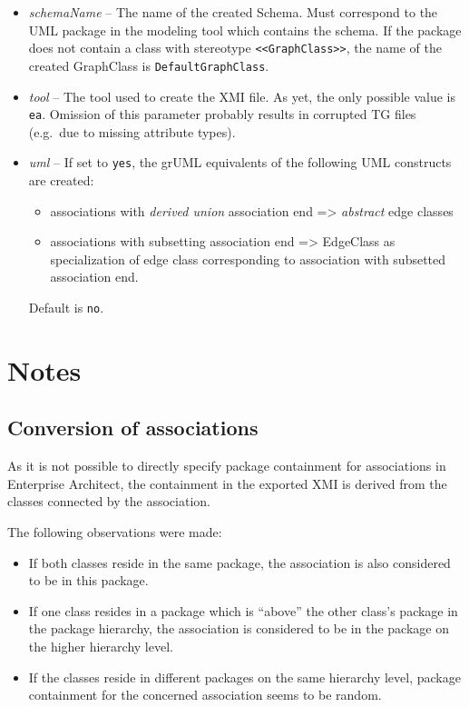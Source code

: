 \documentclass[a4paper]{article}
\begin{document}
\begin{itemize}
		\item \emph{schemaName} -- The name of the created Schema. Must correspond to the UML package in the modeling tool which contains the schema. If the package does not contain a class with stereotype \texttt{<<GraphClass>>}, the name of the created GraphClass is \texttt{DefaultGraphClass}.
		\item \emph{tool} -- The tool used to create the XMI file. As yet, the only possible value is \texttt{ea}. Omission of this parameter probably results in corrupted TG files (e.g.\ due to missing attribute types).
		\item \emph{uml} -- If set to \texttt{yes}, the grUML equivalents of the following UML constructs are created:
		\begin{itemize}
			\item associations with \emph{derived union} association end => \emph{abstract} edge classes
			\item associations with subsetting association end => EdgeClass as specialization of edge class corresponding to association with subsetted association end.
		\end{itemize}
		Default is \texttt{no}.
	\end{itemize}
	
	\section{Notes}
	\subsection{Conversion of associations}
	As it is not possible to directly specify package containment for associations in Enterprise Architect, the containment in the exported XMI is derived from the classes connected by the association.

	The following observations were made:
	\begin{itemize}
		\item If both classes reside in the same package, the association is also considered to be in this package.
		\item If one class resides in a package which is ``above'' the other class's package in the package hierarchy, the association is considered to be in the package on the higher hierarchy level.
		\item If the classes reside in different packages on the same hierarchy level, package containment for the concerned association seems to be random.
	\end{itemize}
\end{document}
